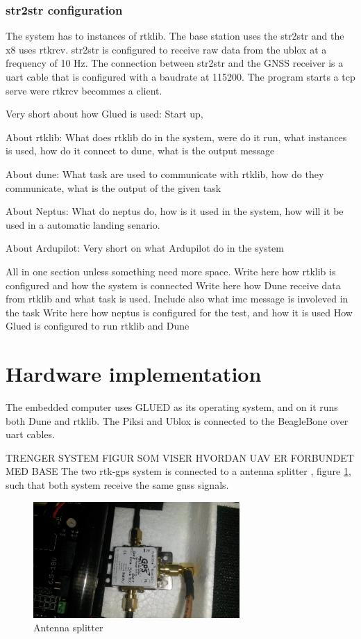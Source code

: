 \subsubsection{str2str configuration}
The system has to instances of rtklib. The base station uses the str2str and the x8 uses rtkrcv. str2str is configured to receive raw data from the ublox at a frequency of 10 Hz. The connection between str2str and the GNSS receiver is a uart cable that is configured with a baudrate at 115200. The program starts a tcp serve were rtkrcv becommes a client.

Very short about how Glued is used: Start up, 

About rtklib: What does rtklib do in the system, were do it run, what instances is used, how do it connect to dune, what is the output message

About dune: What task are used to communicate with rtklib, how do they communicate, what is the output of the given task

About Neptus: What do neptus do, how is it used in the system, how will it be used in a automatic landing senario.

About Ardupilot: Very short on what Ardupilot do in the system 



All in one section unless something need more space.
Write here how rtklib is configured and how the system is connected
Write here how Dune receive data from rtklib and what task is used. Include also what imc message is involeved in the task
Write here how neptus is configured for the test, and how it is used
How Glued is configured to run rtklib and Dune
\section{Hardware implementation}
The embedded computer uses GLUED as its operating system, and on it runs both Dune and rtklib. The Piksi and Ublox is connected to the BeagleBone over uart cables.

TRENGER SYSTEM FIGUR SOM VISER HVORDAN UAV ER FORBUNDET MED BASE
The two \gls{rtk-gps} system is connected to a antenna splitter , figure \ref{figure:AntennaSplitter}, such that both system receive the same \gls{gnss} signals.

\begin{figure}[H]
	\centering
		\includegraphics[width=0.7\textwidth]{figs/066.jpg}
		\caption{Antenna splitter}
		\label{figure:AntennaSplitter}
\end{figure}

